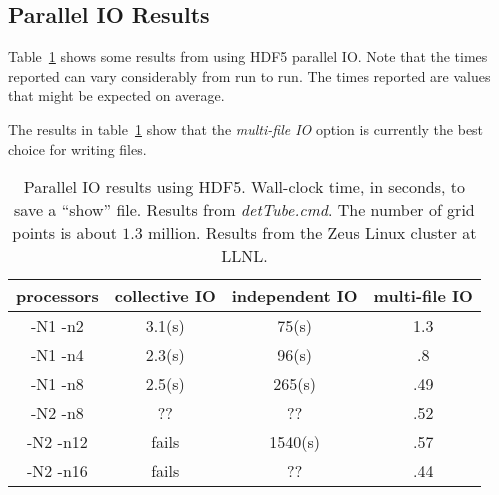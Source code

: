 \documentclass{article}
\begin{document}
\clearpage
\subsection{Parallel IO Results}\label{sec:hdf5Results}

Table~\ref{tab:hdf5Results} shows some results from using HDF5 parallel IO. 
Note that the times reported can vary considerably from run to run. 
The times reported are values that might be expected on average. 

The results in table~\ref{tab:hdf5Results} show that the {\em multi-file IO} option
is currently the best choice for writing files. 


\begin{table}[hbt]
\begin{center}%
\begin{tabular}{|c|c|c|c|} \hline 
 processors & collective IO & independent IO & multi-file IO     \\ \hline
-N1 -n2     &   3.1(s)      &      75(s)     & 1.3           \\
-N1 -n4     &   2.3(s)      &      96(s)     & .8            \\ 
-N1 -n8     &   2.5(s)      &     265(s)     & .49             \\ 
-N2 -n8     &    ??         &      ??        & .52           \\
-N2 -n12    &   fails       &     1540(s)    & .57            \\
-N2 -n16    &   fails       &      ??        & .44            \\ 
\hline
\end{tabular}		
\end{center}		
\caption{Parallel IO results using HDF5. Wall-clock time, in seconds, to save a ``show'' file.
Results from {\em detTube.cmd}. The number of grid points is about $1.3$ million. Results from
the Zeus Linux cluster at LLNL.}
 \label{tab:hdf5Results} 
\end{table}
\end{document}
